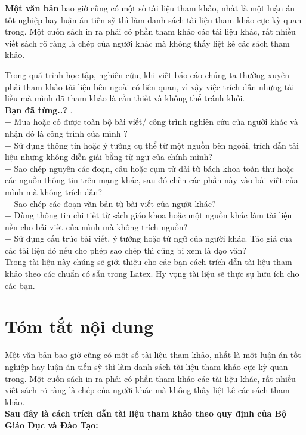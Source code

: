 \documentclass{hcmutarticle}
\begin{document}
\textbf{Một văn bản} 
 bao giờ cũng có một số tài liệu tham khảo, nhất là một luận án tốt nghiệp hay luận án tiến sỹ thì làm danh sách tài liệu tham khảo cực kỳ quan trong. Một cuốn sách in ra phải có phần tham khảo các tài liệu khác, rất nhiều viết sách rõ ràng là chép của người khác mà không thấy liệt kê các sách tham khảo.


Trong quá trình học tập, nghiên cứu, khi viết báo cáo chúng ta thường xuyên phải tham khảo tài liệu bên ngoài có liên quan, vì vậy việc trích dẫn những tài liều mà mình đã tham khảo là cần thiết và không thể tránh khỏi.\\
\textbf{Bạn đã từng..?} .\\
$-$   Mua hoặc có được toàn bộ bài viết/ công trình nghiên cứu của người khác và nhận đó là công trình của mình ?\\
$- $  Sử dụng thông tin hoặc ý tưởng cụ thể từ một nguồn bên ngoài, trích dẫn tài liệu nhưng không diễn giải bằng từ ngữ của chính mình?\\
$- $  Sao chép nguyên các đoạn, câu hoặc cụm từ dài từ bách khoa toàn thư hoặc các nguồn thông tin trên mạng khác, sau đó chèn các phần này vào bài viết của mình mà không trích dẫn?\\
$- $  Sao chép các đoạn văn bản từ bài viết của người khác?\\
$- $  Dùng thông tin chi tiết từ sách giáo khoa hoặc một nguồn khác làm tài liệu nền cho bải viết của mình mà không trích nguồn?\\
$- $  Sử dụng cấu trúc bài viết, ý tưởng hoặc từ ngữ của người khác. Tác giả của các tài liệu đó nếu cho phép sao chép thì cũng bị xem là đạo văn?\\


 Trong tài liệu này chúng sẽ giới thiệu cho các bạn cách trích dẫn tài liệu tham khảo theo các chuẩn có sẵn trong Latex. Hy vọng tài liệu sẽ thực sự hữu ích cho các bạn.\\

\newpage

\section{Tóm tắt nội dung}\label{survey}
Một văn bản bao giờ cũng có một số tài liệu tham khảo, nhất là một luận án tốt nghiệp hay luận án tiến sỹ thì làm danh sách tài liệu tham khảo cực kỳ quan trong. Một cuốn sách in ra phải có phần tham khảo các tài liệu khác, rất nhiều viết sách rõ ràng là chép của người khác mà không thấy liệt kê các sách tham khảo.\\
{\bfseries  Sau đây là cách trích dẫn tài liệu tham khảo theo quy định của Bộ Giáo Dục và Đào Tạo:}\\
\end{document}
